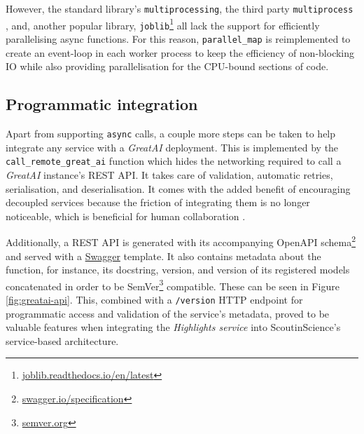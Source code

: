 However, the standard library's \texttt{multiprocessing}, the third party \texttt{multiprocess} \cite{mckerns2012building}, and, another popular library, \texttt{joblib}\footnote{\href{https://joblib.readthedocs.io/en/latest/}{joblib.readthedocs.io/en/latest}} all lack the support for efficiently parallelising async functions. For this reason, \texttt{parallel\_map} is reimplemented to create an event-loop in each worker process to keep the efficiency of non-blocking IO while also providing parallelisation for the CPU-bound sections of code.

\subsection{Programmatic integration}

Apart from supporting \texttt{async} calls, a couple more steps can be taken to help integrate any service with a \textit{GreatAI} deployment. This is implemented by the \texttt{call\_remote\_great\_ai} function which hides the networking required to call a \textit{GreatAI} instance's REST API. It takes care of validation, automatic retries, serialisation, and deserialisation. It comes with the added benefit of encouraging decoupled services because the friction of integrating them is no longer noticeable, which is beneficial for human collaboration \cite{hasselbring2002component}.

Additionally, a REST API is generated with its accompanying OpenAPI schema\footnote{\href{https://swagger.io/specification}{swagger.io/specification}} and served with a \href{https://swagger.io/}{Swagger} template. It also contains metadata about the function, for instance, its docstring, version, and version of its registered models concatenated in order to be SemVer\footnote{\href{https://semver.org/}{semver.org}} compatible. These can be seen in Figure \ref{fig:greatai-api}. This, combined with a \texttt{/version} HTTP endpoint for programmatic access and validation of the service's metadata, proved to be valuable features when integrating the \textit{Highlights service} into ScoutinScience's service-based architecture.

